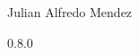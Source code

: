 \documentclass[12pt,a4paper]{book}
\begin{document}
    \begin{center}

        \phantom{H}

        \vspace{80mm}

        {\huge{\Soda}}

        \vspace{80mm}
        Julian Alfredo Mendez

        \vspace{10mm}
        0.8.0

    \end{center}

    \newpage

    
    
    
    
    

    \appendix

    
    
\end{document}

